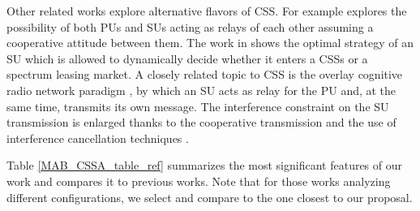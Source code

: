 Other related works explore alternative flavors of CSS. For example \cite{ref:Tran2014} explores the possibility of both PUs and SUs acting as relays of each other assuming a cooperative attitude between them. 
The work in \cite{ref:Shao2014} shows the optimal strategy of an SU which is allowed to dynamically decide whether it enters a CSSs or a spectrum leasing market. A closely related topic to CSS is the overlay cognitive radio network paradigm \cite{ref:Goldsmith2009}, by which an SU acts as relay for the PU and, at the same time, transmits its own message. 
The interference constraint on the SU transmission is enlarged thanks to the cooperative transmission and the use of interference cancellation techniques \cite{ref:Han2010}. 

Table \ref{MAB_CSSA_table_ref} summarizes the most significant features of our work and compares it to previous works. 
Note that for those works analyzing different configurations, we select and compare to the one closest to our proposal. 

